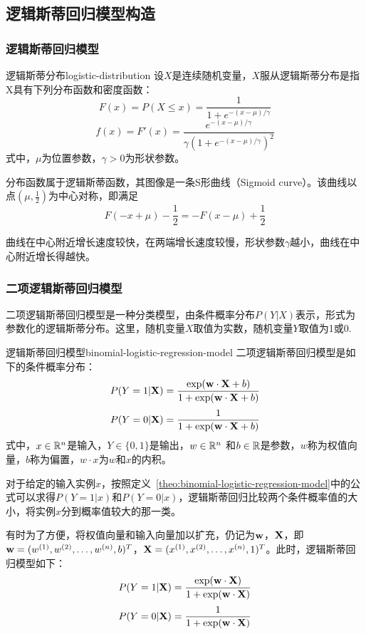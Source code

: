 \subsection{逻辑斯蒂回归模型构造}
\subsubsection{逻辑斯蒂回归模型}
\begin{theobox}{逻辑斯蒂分布}{logistic-distribution}
    设$X$是连续随机变量，$X$服从逻辑斯蒂分布是指 X具有下列分布函数和密度函数：
        \[
            F(x) = P(X\leq x) = \frac{1}{1+e^{-(x-\mu)/\gamma}}
        \]
        \[
            f(x) = F'(x) = \frac{e^{-(x-\mu)/\gamma}}{\gamma (1+e^{-(x-\mu)/\gamma})^2}
        \]
    式中，$\mu$为位置参数，$\gamma>0$为形状参数。
\end{theobox}

分布函数属于逻辑斯蒂函数，其图像是一条S形曲线（Sigmoid curve）。该曲线以点$(\mu,\tfrac{1}{2})$为中心对称，即满足
\[
    F(-x+\mu)-\frac{1}{2} = -F(x-\mu)+\frac{1}{2}
\]

曲线在中心附近增长速度较快，在两端增长速度较慢，形状参数$\gamma$越小，曲线在中心附近增长得越快。

\subsubsection{二项逻辑斯蒂回归模型}
二项逻辑斯蒂回归模型是一种分类模型，由条件概率分布$P(Y|X)$表示，形式为参数化的逻辑斯蒂分布。这里，随机变量$X$取值为实数，随机变量$Y$取值为1或0.

\begin{theobox}{逻辑斯蒂回归模型}{binomial-logistic-regression-model}
    二项逻辑斯蒂回归模型是如下的条件概率分布：
    \[
        P(Y=1|\mathbf{X}) = \frac{\exp(\mathbf{w}\cdot\mathbf{X} + b)}{1 + \exp(\mathbf{w}\cdot\mathbf{X}+b)}
    \]
    \[
        P(Y=0|\mathbf{X}) = \frac{1}{1 + \exp(\mathbf{w}\cdot\mathbf{X}+b)}
    \]
    式中，$x\in\mathbb{R}^n$是输入，$Y\in\{0,1\}$是输出，$w\in\mathbb{R}^n$ 和$b\in\mathbb{R}$是参数，$w$称为权值向量，$b$称为偏置，$w\cdot x$为$w$和$x$的内积。
\end{theobox}

对于给定的输入实例$x$，按照定义~\ref{theo:binomial-logistic-regression-model}中的公式可以求得$P(Y=1|x)$和$P(Y=0|x)$，逻辑斯蒂回归比较两个条件概率值的大小，将实例$x$分到概率值较大的那一类。

有时为了方便，将权值向量和输入向量加以扩充，仍记为$\mathbf{w}$，$\mathbf{X}$，即$\mathbf{w}=(w^{(1)},w^{(2)},\ldots,w^{(n)},b)^T$，$\mathbf{X}=(x^{(1)},x^{(2)},\ldots,x^{(n)},1)^T$。此时，逻辑斯蒂回归模型如下：
\[
    P(Y=1|\mathbf{X}) = \frac{\exp(\mathbf{w}\cdot\mathbf{X})}{1+\exp(\mathbf{w}\cdot\mathbf{X})}
\]
\[
    P(Y=0|\mathbf{X}) = \frac{1}{1+\exp(\mathbf{w}\cdot\mathbf{X})}
\]

